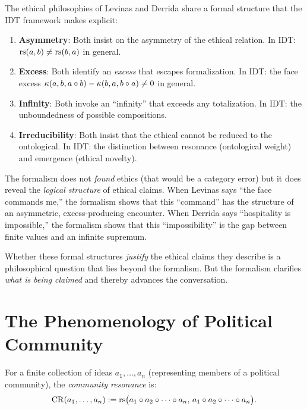 \begin{remark}
The ethical philosophies of Levinas and Derrida share a formal structure
that the IDT framework makes explicit:

\begin{enumerate}
\item \textbf{Asymmetry}: Both insist on the asymmetry of the ethical
relation. In IDT: $\mathrm{rs}(a, b) \neq \mathrm{rs}(b, a)$ in general.
\item \textbf{Excess}: Both identify an \emph{excess} that escapes
formalization. In IDT: the face excess
$\kappa(a, b, a \circ b) - \kappa(b, a, b \circ a) \neq 0$ in general.
\item \textbf{Infinity}: Both invoke an ``infinity'' that exceeds any
totalization. In IDT: the unboundedness of possible compositions.
\item \textbf{Irreducibility}: Both insist that the ethical cannot be
reduced to the ontological. In IDT: the distinction between resonance
(ontological weight) and emergence (ethical novelty).
\end{enumerate}

The formalism does not \emph{found} ethics (that would be a category error)
but it does reveal the \emph{logical structure} of ethical claims. When
Levinas says ``the face commands me,'' the formalism shows that this
``command'' has the structure of an asymmetric, excess-producing encounter.
When Derrida says ``hospitality is impossible,'' the formalism shows that
this ``impossibility'' is the gap between finite values and an infinite
supremum.

Whether these formal structures \emph{justify} the ethical claims they
describe is a philosophical question that lies beyond the formalism. But the
formalism clarifies \emph{what is being claimed} and thereby advances the
conversation.
\end{remark}

\section{The Phenomenology of Political Community}
\label{sec:political-phenomenology}

\begin{definition}
\label{def:community-resonance}
For a finite collection of ideas $a_1, \ldots, a_n$ (representing members
of a political community), the \emph{community resonance} is:
\[
\mathrm{CR}(a_1, \ldots, a_n) := \mathrm{rs}\bigl(a_1 \circ a_2 \circ \cdots
\circ a_n,\, a_1 \circ a_2 \circ \cdots \circ a_n\bigr).
\]
\end{definition}

